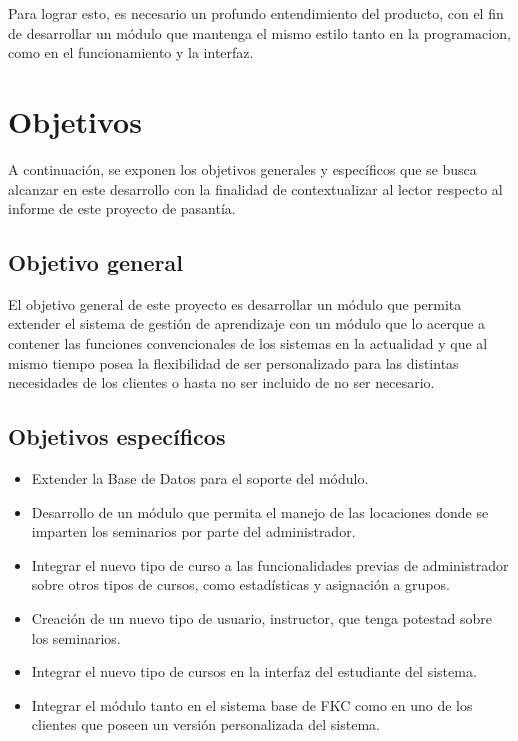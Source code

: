 Para lograr esto, es necesario un profundo entendimiento del producto, con el fin de desarrollar un módulo que mantenga el mismo estilo tanto en la programacion, como en el funcionamiento y la interfaz. 


\section*{Objetivos}
A continuación, se exponen los objetivos generales y específicos que se busca alcanzar en este desarrollo con la finalidad de contextualizar al lector respecto al informe de este proyecto de pasantía.

\subsection*{Objetivo general}
El objetivo general de este proyecto es desarrollar un módulo que permita extender el sistema de gestión de aprendizaje con un módulo que lo acerque a contener las funciones convencionales de los sistemas en la actualidad y que al mismo tiempo posea la flexibilidad de ser personalizado para las distintas necesidades de los clientes o hasta no ser incluido de no ser necesario.

\subsection*{Objetivos específicos}

\begin{itemize}
\item Extender la Base de Datos para el soporte del módulo.
\item Desarrollo de un módulo que permita el manejo de las locaciones donde se imparten los seminarios por parte del administrador.
\item Integrar el nuevo tipo de curso a las funcionalidades previas de administrador sobre otros tipos de cursos, como estadísticas y asignación a grupos.
\item Creación de un nuevo tipo de usuario, instructor, que tenga potestad sobre los seminarios.
\item Integrar el nuevo tipo de cursos en la interfaz del estudiante del sistema.
\item Integrar el módulo tanto en el sistema base de FKC como en uno de los clientes que poseen un versión personalizada del sistema.
\end{itemize}








